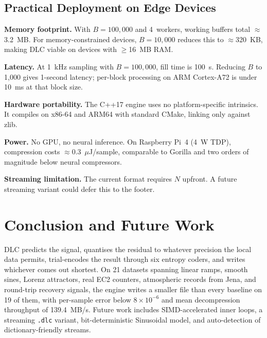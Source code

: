 \documentclass[runningheads]{llncs}
\begin{document}
\subsection{Practical Deployment on Edge Devices}

\textbf{Memory footprint.} With $B = 100{,}000$ and 4~workers, working buffers total $\approx$3.2~MB. For memory-constrained devices, $B = 10{,}000$ reduces this to $\approx$320~KB, making DLC viable on devices with $\ge$16~MB RAM.

\textbf{Latency.} At 1~kHz sampling with $B = 100{,}000$, fill time is 100~s. Reducing $B$ to 1,000 gives 1-second latency; per-block processing on ARM Cortex-A72 is under 10~ms at that block size.

\textbf{Hardware portability.} The C++17 engine uses no platform-specific intrinsics. It compiles on x86-64 and ARM64 with standard CMake, linking only against zlib.

\textbf{Power.} No GPU, no neural inference. On Raspberry Pi~4 (4~W TDP), compression costs $\approx$0.3~$\mu$J/sample, comparable to Gorilla and two orders of magnitude below neural compressors.

\textbf{Streaming limitation.} The current format requires $N$ upfront. A future streaming variant could defer this to the footer.


\section{Conclusion and Future Work}
\label{sec:conclusion}

DLC predicts the signal, quantises the residual to whatever precision the local data permits, trial-encodes the result through six entropy coders, and writes whichever comes out shortest. On 21 datasets spanning linear ramps, smooth sines, Lorenz attractors, real EC2 counters, atmospheric records from Jena, and round-trip recovery signals, the engine writes a smaller file than every baseline on 19 of them, with per-sample error below $8\times 10^{-6}$ and mean decompression throughput of 139.4~MB/s. Future work includes SIMD-accelerated inner loops, a streaming \texttt{.dlc} variant, bit-deterministic Sinusoidal model, and auto-detection of dictionary-friendly streams.
\end{document}

